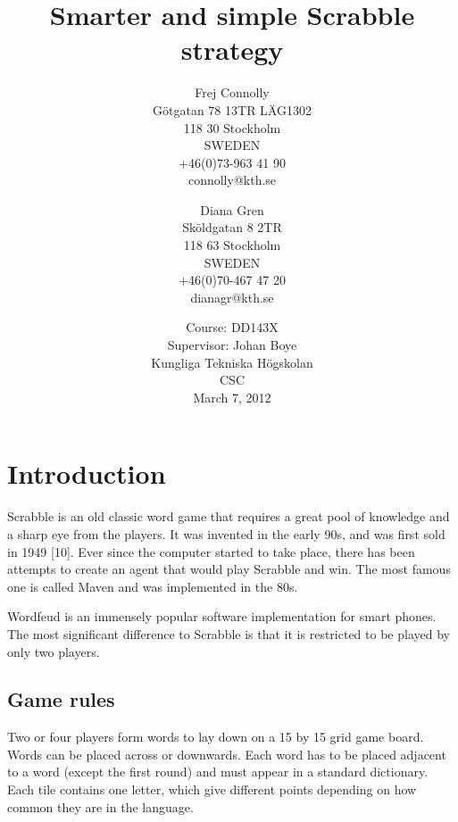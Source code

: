 \documentclass[a4paper, 12pt]{report}
\begin{document}
\title{Smarter and simple Scrabble strategy}
\date{Course: DD143X \\ Supervisor: Johan Boye \\ Kungliga Tekniska Högskolan \\ CSC \\ March 7, 2012}
\author{Frej Connolly \\ Götgatan 78 13TR LÄG1302 \\ 118 30 Stockholm \\ SWEDEN \\ +46(0)73-963 41 90 \\ connolly@kth.se \\
        \and Diana Gren \\ Sköldgatan 8 2TR \\ 118 63 Stockholm \\ SWEDEN \\ +46(0)70-467 47 20 \\ dianagr@kth.se}

\maketitle
\tableofcontents


\chapter{Introduction}
Scrabble is an old classic word game that requires a great pool of knowledge and a sharp eye from the players. It was invented in the early 90s, and was first sold in 1949 [10]. Ever since the computer started to take place, there has been attempts to create an agent that would play Scrabble and win. The most famous one is called Maven and was implemented in the 80s.

Wordfeud is an immensely popular software implementation for smart phones. The most significant difference to Scrabble is that it is restricted to be played by only two players.

\section{Game rules}
Two or four players form words to lay down on a 15 by 15 grid game board. Words can be placed across or downwards. Each word has to be placed adjacent to a word (except the first round) and must appear in a standard dictionary. Each tile contains one letter, which give different points depending on how common they are in the language.  
\end{document}
